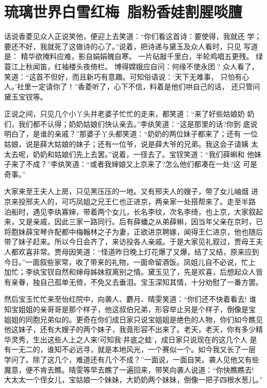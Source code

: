 \chapter{琉璃世界白雪红梅~脂粉香娃割腥啖膻}

话说香菱见众人正说笑他，便迎上去笑道：“你们看这首诗：要使得，我就还
学；要还不好，我就死了这做诗的心了。”说着，把诗递与黛玉及众人看时，只见
写道是：
精华欲掩料应难，影自娟娟魄自寒。
一片砧敲千里白，半轮鸡唱五更残。
绿蓑江上秋闻笛，红袖楼头夜倚栏。
博得嫦娥应自问：何缘不使永团?
众人看了，笑道：“这首不但好，而且新巧有意趣。可知俗语说：‘天下无难事，
只怕有心人。’社里一定请你了！”香菱听了，心下不信，料着是他们哄自己的话，
还只管问黛玉宝钗等。

正说之间，只见几个小丫头并老婆子忙忙的走来，都笑道：“来了好些姑娘奶
奶们，我们都不认得；奶奶姑娘们快认亲去。”李纨笑道：“这是那里的话?你到
底说明白了，是谁的亲戚？”那婆子丫头都笑道：“奶奶的两位妹子都来了；还有
一位姑娘，说是薛大姑娘的妹子；还有一位爷，说是薛大爷的兄弟。我这会子请姨
太太去呢，奶奶和姑娘们先上去罢。”说着，一径去了。宝钗笑道：“我们薛蝌和
他妹子来了不成？”李纨笑道：“或者我婶娘又上京来了?怎么他们都凑在一处?这
可是奇事。”

大家来至王夫人上房，只见黑压压的一地。又有邢夫人的嫂子，带了女儿岫烟
进京来投邢夫人的，可巧凤姐之兄王仁也正进京，两亲家一处搭帮来了。走至半路
泊船时，遇见李纨寡婶，带着两个女儿，长名李纹，次名李绮，也上京，大家叙起
来，又是亲戚，因此三家一路同行。后有薛蟠之从弟薛蝌，因当年父亲在京时，已
将胞妹薛宝琴许配都中梅翰林之子为妻，正欲进京聘嫁，闻得王仁进京，他也随后
带了妹子赶来。所以今日会齐了，来访投各人亲戚。于是大家见礼叙过，贾母王夫
人都欢喜非常。贾母因笑道：“怪道昨日晚上灯花爆了又爆，结了又结，原来应到
今日。”一面叙些家常，收了带来的礼物，一面命留酒饭。凤姐儿自不必说，忙上
加忙；李纨宝钗自然和婶母姊妹叙离别之情。黛玉见了，先是欢喜，后想起众人皆
有亲眷，独自己孤单无倚，不免又去垂泪。宝玉深知其情，十分劝慰了一番方罢。

然后宝玉忙忙来至怡红院中，向袭人、麝月、晴雯笑道：“你们还不快着看去!
谁知宝姐姐的亲哥哥是那个样子，他这叔伯兄弟，形容举止另是个样子，倒像是宝
姐姐的同胞兄弟似的。更奇在你们成日家只说宝姐姐是绝色的人物，你们如今瞧见
他这妹子，还有大嫂子的两个妹子，我竟形容不出来了。老天，老天，你有多少精
华灵秀，生出这些人上之人来!可知我‘井底之蛙’，成日家只说现在的这几个人
是有一无二的，谁知不必远寻，就是本地风光，一个赛似一个。如今我又长了一层
学问了。除了这几个，难道还有几个不成？”一面说，一面自笑。袭人见他又有些
魔意，便不肯去瞧。晴雯等早去瞧了一遍回来，带笑向袭人说道：“你快瞧瞧去!
大太太一个侄女儿，宝姑娘一个妹妹，大奶奶两个妹妹，倒像一把子四根水葱儿。”

